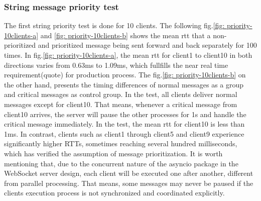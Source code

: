 \subsubsection{String message priority test}
The first string priority test is done for 10 clients. The following fig.\ref{fig: priority-10clients-a} 
and \ref{fig: priority-10clients-b} shows the mean \gls{rtt} 
that a non-prioritized and prioritized message being sent forward and back separately for 100 times.
In fig.\ref{fig: priority-10clients-a}, the mean \gls{rtt} for client1 to client10 in both directions 
varies from 0.63ms to 1.09ms, 
which fullfills the near real time requirement(quote) for production process. 
The fig.\ref{fig: priority-10clients-b} on the other hand, 
presents the timing differences of normal messages as a group and critical messages as control group. 
In the test, all clients deliver normal messages except for client10. That means, whenever a critical 
message from client10 arrives, the server will pause the other processes for 1s and handle the 
critical message immediately. In the test, the mean \gls{rtt} for client10 is less than 1ms. 
In contrast, clients such as client1 through client5 and client9 experience 
significantly higher RTTs, sometimes reaching several hundred milliseconds, which 
has verified the assumption of message prioritization. It is worth mentioning that, due to the concurrent 
nature of the asyncio package in the WebSocket server design, each client will be executed 
one after another, different from parallel processing. That means, some messages may never be paused 
if the clients execution process is not synchronized and coordinated explicitly. 

